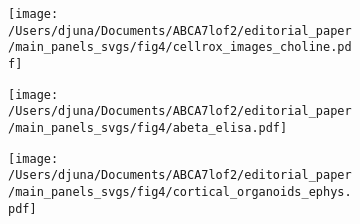 \documentclass[12pt]{article}
\begin{document}
\begin{figure}[H]
    \begin{subfigure}[t]{.4\textwidth}
        \caption{}
        \texttt{[image: /Users/djuna/Documents/ABCA7lof2/editorial\_paper/main\_panels\_svgs/fig4/cellrox\_images\_choline.pdf]}        
    \end{subfigure}
    \begin{subfigure}[t]{.39\textwidth}
        \caption{}
        \texttt{[image: /Users/djuna/Documents/ABCA7lof2/editorial\_paper/main\_panels\_svgs/fig4/abeta\_elisa.pdf]}        
    \end{subfigure}  
    \begin{subfigure}[t]{.2\textwidth}
        \caption{}
        \texttt{[image: /Users/djuna/Documents/ABCA7lof2/editorial\_paper/main\_panels\_svgs/fig4/cortical\_organoids\_ephys.pdf]}        
    \end{subfigure} 
\end{figure}
\end{document}
